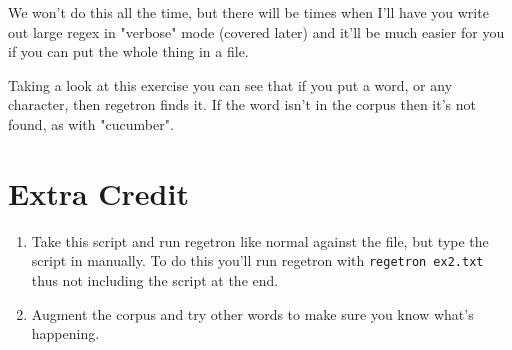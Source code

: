 We won't do this all the time, but there will be times when I'll have you write
out large regex in "verbose" mode (covered later) and it'll be much easier
for you if you can put the whole thing in a file.

Taking a look at this exercise you can see that if you put a word, or any character,
then regetron finds it. If the word isn't in the corpus then it's not found, as with
"cucumber".

\section{Extra Credit}

\begin{enumerate}
\item Take this script and run regetron like normal against the file, but type
    the script in manually.  To do this you'll run regetron with 
    \verb|regetron ex2.txt| thus not including the script at the end.
\item Augment the corpus and try other words to make sure you know what's happening.
\end{enumerate}

